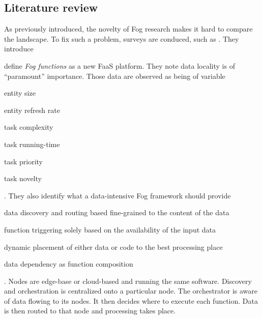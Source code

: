 \documentclass[11pt]{sdm}
\begin{document}
\subsection{Literature review}

As previously introduced, the novelty of Fog research makes it hard to compare the landscape. To fix such a problem, surveys are conduced, such as . They introduce \cite{cheng_fog_2019, baresi_paps_2019, baresi_towards_2019, cicconetti_decentralized_2021} %

\citet{cheng_fog_2019} define \textit{Fog functions} as a new \gls{FaaS} platform. They note data locality is of ``paramount'' importance. Those data are observed as being of variable
\begin{enumerate*}
	\item entity size
	\item entity refresh rate
	\item task complexity
	\item task running-time
	\item task priority
	\item task novelty
\end{enumerate*}. They also identify what a data-intensive Fog framework should provide
\begin{enumerate*}
	\item data discovery and routing based fine-grained to the content of the data
	\item function triggering solely based on the availability of the input data
	\item dynamic placement of either data or code to the best processing place
	\item data dependency as function composition
\end{enumerate*}.
Nodes are edge-base or cloud-based and running the same software. Discovery and orchestration is centralized onto a particular node. The orchestrator is aware of data flowing to its nodes. It then decides where to execute each function. Data is then routed to that node and processing takes place.
\end{document}

